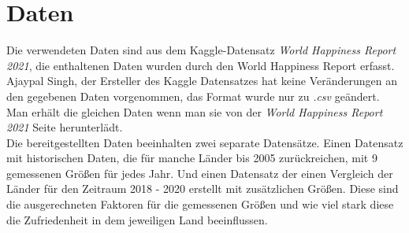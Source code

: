 \section{Daten}

Die verwendeten Daten sind aus dem Kaggle-Datensatz \textit{World Happiness Report 2021}, die enthaltenen Daten wurden durch den World Happiness Report erfasst. Ajaypal Singh, der Ersteller des Kaggle Datensatzes hat keine Veränderungen an den gegebenen Daten vorgenommen, das Format wurde nur zu \textit{.csv} geändert. Man erhält die gleichen Daten wenn man sie von der \textit{World Happiness Report 2021} Seite herunterlädt. \cite{helliwell_world_2021}  \\

Die bereitgestellten Daten beeinhalten zwei separate Datensätze. Einen Datensatz mit historischen Daten, die für manche Länder bis 2005 zurückreichen, mit 9 gemessenen Größen für jedes Jahr. Und einen Datensatz der einen Vergleich der Länder für den Zeitraum 2018 - 2020 erstellt mit zusätzlichen Größen. Diese sind die ausgerechneten Faktoren für die gemessenen Größen und wie viel stark diese die Zufriedenheit in dem jeweiligen Land beeinflussen. \\

